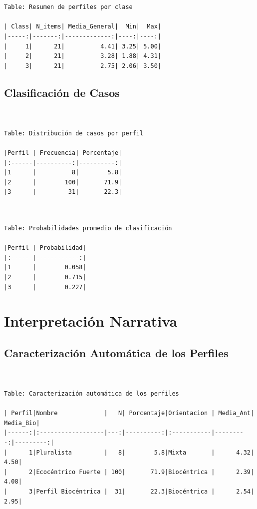 \documentclass[
  11pt,
  letterpaper,
  DIV=11,
  numbers=noendperiod]{scrartcl}
\begin{document}
\begin{verbatim}


Table: Resumen de perfiles por clase

| Class| N_items| Media_General|  Min|  Max|
|-----:|-------:|-------------:|----:|----:|
|     1|      21|          4.41| 3.25| 5.00|
|     2|      21|          3.28| 1.88| 4.31|
|     3|      21|          2.75| 2.06| 3.50|
\end{verbatim}

\subsection{Clasificación de Casos}\label{clasificaciuxf3n-de-casos}

\begin{verbatim}


Table: Distribución de casos por perfil

|Perfil | Frecuencia| Porcentaje|
|:------|----------:|----------:|
|1      |          8|        5.8|
|2      |        100|       71.9|
|3      |         31|       22.3|
\end{verbatim}

\begin{verbatim}


Table: Probabilidades promedio de clasificación

|Perfil | Probabilidad|
|:------|------------:|
|1      |        0.058|
|2      |        0.715|
|3      |        0.227|
\end{verbatim}

\newpage

\section{Interpretación Narrativa}\label{interpretaciuxf3n-narrativa}

\subsection{Caracterización Automática de los
Perfiles}\label{caracterizaciuxf3n-automuxe1tica-de-los-perfiles}

\begin{verbatim}


Table: Caracterización automática de los perfiles

| Perfil|Nombre             |   N| Porcentaje|Orientacion | Media_Ant| Media_Bio|
|------:|:------------------|---:|----------:|:-----------|---------:|---------:|
|      1|Pluralista         |   8|        5.8|Mixta       |      4.32|      4.50|
|      2|Ecocéntrico Fuerte | 100|       71.9|Biocéntrica |      2.39|      4.08|
|      3|Perfil Biocéntrica |  31|       22.3|Biocéntrica |      2.54|      2.95|
\end{verbatim}
\end{document}
